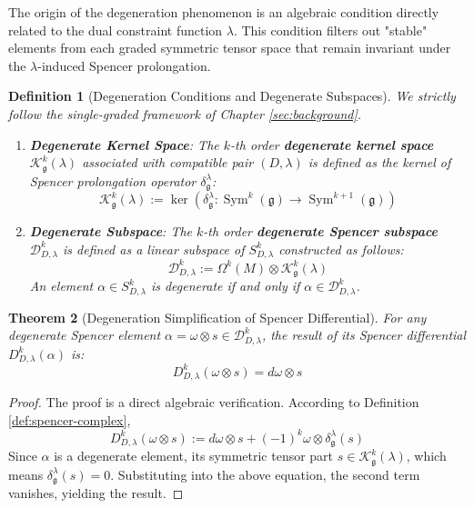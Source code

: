\documentclass[a4paper,12pt]{extarticle}
\theoremstyle{plain}
\newtheorem{theorem}{Theorem}[section]
\newtheorem{definition}[theorem]{Definition}
\theoremstyle{definition}
\begin{document}
The origin of the degeneration phenomenon is an algebraic condition directly related to the dual constraint function $\lambda$. This condition filters out "stable" elements from each graded symmetric tensor space that remain invariant under the $\lambda$-induced Spencer prolongation.

\begin{definition}[Degeneration Conditions and Degenerate Subspaces]
\label{def:degenerate_spencer_element_final}
We strictly follow the single-graded framework of Chapter \ref{sec:background}.
\begin{enumerate}
    \item \textbf{Degenerate Kernel Space}: The $k$-th order \textbf{degenerate kernel space} $\mathcal{K}_{\mathfrak{g}}^{k}(\lambda)$ associated with compatible pair $(D,\lambda)$ is defined as the kernel of Spencer prolongation operator $\delta_{\mathfrak{g}}^{\lambda}$:
    $$\mathcal{K}_{\mathfrak{g}}^{k}(\lambda) := \ker\left(\delta_{\mathfrak{g}}^{\lambda}: \operatorname{Sym}^k(\mathfrak{g}) \to \operatorname{Sym}^{k+1}(\mathfrak{g})\right)$$
    
    \item \textbf{Degenerate Subspace}: The $k$-th order \textbf{degenerate Spencer subspace} $\mathcal{D}_{D,\lambda}^{k}$ is defined as a linear subspace of $S_{D,\lambda}^{k}$ constructed as follows:
    $$\mathcal{D}_{D,\lambda}^{k} := \Omega^k(M) \otimes \mathcal{K}_{\mathfrak{g}}^{k}(\lambda)$$
    An element $\alpha \in S_{D,\lambda}^{k}$ is degenerate if and only if $\alpha \in \mathcal{D}_{D,\lambda}^{k}$.
\end{enumerate}
\end{definition}

\begin{theorem}[Degeneration Simplification of Spencer Differential]
\label{thm:degeneration_simplification_final}
For any degenerate Spencer element $\alpha = \omega \otimes s \in \mathcal{D}_{D,\lambda}^{k}$, the result of its Spencer differential $D_{D,\lambda}^{k}(\alpha)$ is:
$$D_{D,\lambda}^{k}(\omega \otimes s) = d\omega \otimes s$$
\end{theorem}
\begin{proof}
The proof is a direct algebraic verification. According to Definition \ref{def:spencer-complex},
$$D_{D,\lambda}^{k}(\omega \otimes s) := d\omega \otimes s + (-1)^k \omega \otimes \delta_{\mathfrak{g}}^{\lambda}(s)$$
Since $\alpha$ is a degenerate element, its symmetric tensor part $s \in \mathcal{K}_{\mathfrak{g}}^{k}(\lambda)$, which means $\delta_{\mathfrak{g}}^{\lambda}(s) = 0$. Substituting into the above equation, the second term vanishes, yielding the result.
\end{proof}
\end{document}
